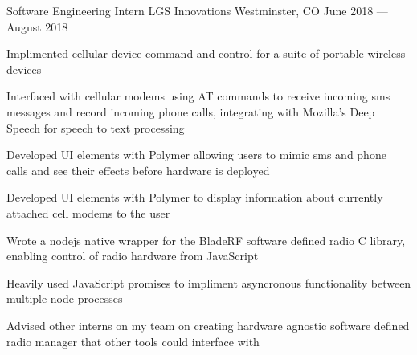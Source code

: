 

\begin{cventries}

  \cventry
    {Software Engineering Intern} %
    {LGS Innovations} %
    {Westminster, CO} %
    {June 2018 --- August 2018} %
    {
      \begin{cvitems} %
        \item {Implimented cellular device command and control for a suite of portable wireless devices}
        \item {Interfaced with cellular modems using AT commands to receive incoming sms messages and record incoming phone calls, integrating with Mozilla's Deep Speech for speech to text processing}
        \item {Developed UI elements with Polymer allowing users to mimic sms and phone calls and see their effects before hardware is deployed}
        \item {Developed UI elements with Polymer to display information about currently attached cell modems to the user}
        \item {Wrote a nodejs native wrapper for the BladeRF software defined radio C library, enabling control of radio hardware from JavaScript}
        \item {Heavily used JavaScript promises to impliment asyncronous functionality between multiple node processes}
        \item {Advised other interns on my team on creating hardware agnostic software defined radio manager that other tools could interface with}
      \end{cvitems}
    }


\end{cventries}
